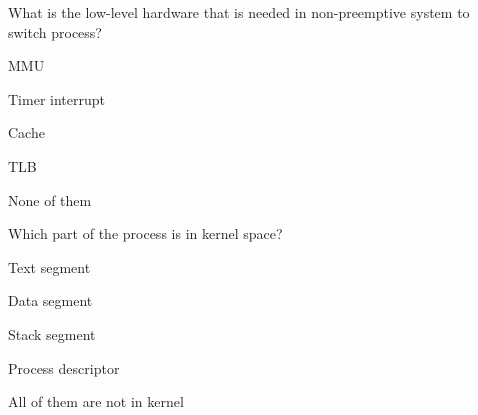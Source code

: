 \begin{questions}
\question What is the low-level hardware that is needed in non-preemptive system to switch process?
\begin{verticalchoices}
\item MMU
\item Timer interrupt
\item Cache
\item TLB
\item None of them
\end{verticalchoices}
\question Which part of the process is in kernel space?
\begin{verticalchoices}
\item Text segment
\item Data segment
\item Stack segment
\item Process descriptor
\item All of them are not in kernel
\end{verticalchoices}
\end{questions}\vfill\newpage

